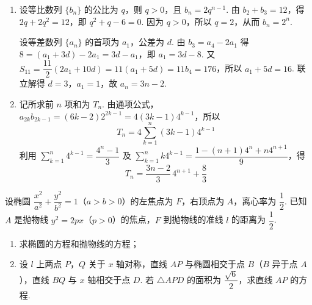 \begin{solution}
\begin{enumerate}
\item 设等比数列 \(\{b_n\}\) 的公比为 \(q\)，则 \(q>0\)，且
\(b_n=2q^{n-1}\). 由 \(b_2+b_3=12\)，得 \(2q+2q^2=12\)，即
\(q^2+q-6=0\). 因为 \(q>0\)，所以 \(q=2\)，从而 \(b_n=2^n\).

设等差数列 \(\{a_n\}\) 的首项为 \(a_1\)，公差为 \(d\). 由 \(b_3=a_4-2a_1\) 得
\(8=(a_1+3d)-2a_1=3d-a_1\)，即 \(a_1=3d-8\). 又
\(S_{11}=\dfrac{11}{2}(2a_1+10d)=11(a_1+5d)=11b_4=176\)，所以 \(a_1+5d=16\). 联立解得 \(d=3\)，\(a_1=1\)，故 \(a_n=3n-2\).

\item 记所求前 \(n\) 项和为 \(T_n\). 由通项公式，
\(a_{2k}b_{2k-1}=(6k-2)2^{2k-1}=4(3k-1)4^{k-1}\)，所以
\[
T_n=4\sum_{k=1}^n(3k-1)4^{k-1}
\]
利用
\(\displaystyle\sum_{k=1}^n4^{k-1}=\dfrac{4^n-1}{3}\) 及
\(\displaystyle\sum_{k=1}^nk4^{k-1}=\dfrac{1-(n+1)4^n+n4^{n+1}}{9}\)，得
\[
T_n=\frac{3n-2}{3}\,4^{n+1}+\frac83
\]
\end{enumerate}
\end{solution}

\begin{problem}
设椭圆 \(\dfrac{x^2}{a^2}+\dfrac{y^2}{b^2}=1\)（\(a>b>0\)）的左焦点为 \(F\)，右顶点为 \(A\)，离心率为 \(\dfrac{1}{2}\). 已知 \(A\) 是抛物线 \(y^2=2px\)（\(p>0\)）的焦点，\(F\) 到抛物线的准线 \(l\) 的距离为 \(\dfrac{1}{2}\).

\begin{enumerate}
\item 求椭圆的方程和抛物线的方程；
\item 设 \(l\) 上两点 \(P\)，\(Q\) 关于 \(x\) 轴对称，直线 \(AP\) 与椭圆相交于点 \(B\)（\(B\) 异于点 \(A\)），直线 \(BQ\) 与 \(x\) 轴相交于点 \(D\). 若 \(\triangle APD\) 的面积为 \(\dfrac{\sqrt{6}}{2}\)，求直线 \(AP\) 的方程.
\end{enumerate}
\end{problem}

